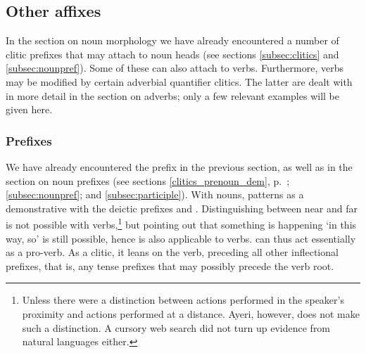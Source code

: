 


\subsection{Other affixes}

In the section on noun morphology we have already encountered a number of
clitic prefixes that may attach to noun heads (see sections
\ref{subsec:clitics} and \ref{subsec:nounpref}). Some of these can also attach
to verbs. Furthermore, verbs may be modified by certain adverbial quantifier
clitics. The latter are dealt with in more detail in the section on adverbs;
only a few relevant examples will be given here.

\subsubsection{Prefixes}
\label{subsubsec:verbprefixes}

We have already encountered the prefix  in the
previous section, as well as in the section on noun prefixes (see sections
\ref{clitics_prenoun_dem}, p.~\pageref{clitics_prenoun_dem}; 
\ref{subsec:nounpref}; and \ref{subsec:participle}). With nouns,
 patterns as a demonstrative with the deictic prefixes
 and . Distinguishing between near
and far is not possible with verbs,\footnote{Unless there were a distinction
between actions performed in the speaker's proximity and actions performed at a
distance. Ayeri, however, does not make such a distinction. A cursory web
search did not turn up evidence from natural languages either.} but pointing
out that something is happening `in this way, so' is still possible, hence
 is also applicable to verbs.  can thus act
essentially as a pro-verb. As a clitic, it leans on the verb, preceding all
other inflectional prefixes, that is, any tense prefixes that may possibly
precede the verb root.

